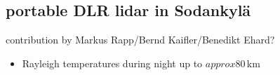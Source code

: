 \subsection{portable DLR lidar in Sodankyl\"a}
contribution by Markus Rapp/Bernd Kaifler/Benedikt Ehard?

\begin{itemize}
  \item Rayleigh temperatures during night up to $approx 80$\,km
\end{itemize}